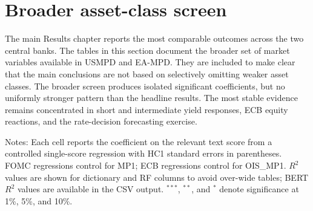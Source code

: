 

\section{Broader asset-class screen}
\label{app:a2_broad_outcomes}

The main Results chapter reports the most comparable outcomes across the two
central banks. The tables in this section document the broader set of market
variables available in USMPD and EA-MPD. They are included to make clear that
the main conclusions are not based on selectively omitting weaker asset classes.
The broader screen produces isolated significant coefficients, but no uniformly
stronger pattern than the headline results. The most stable evidence remains
concentrated in short and intermediate yield responses, ECB equity reactions,
and the rate-decision forecasting exercise.

\begin{table}[H]
\centering
\caption{Additional RQ1 outcomes: FOMC statements}
\label{tab:a2_broad_fomc_statements}
\begin{threeparttable}
\scriptsize
{}
\begin{tablenotes}
\footnotesize
\item Notes: Each cell reports the coefficient on the relevant text score from a controlled single-score regression with HC1 standard errors in parentheses. FOMC regressions control for MP1; ECB regressions control for OIS\_MP1. $R^2$ values are shown for dictionary and RF columns to avoid over-wide tables; BERT $R^2$ values are available in the CSV output. $^{***}$, $^{**}$, and $^{*}$ denote significance at 1\%, 5\%, and 10\%.
\end{tablenotes}
\end{threeparttable}
\end{table}

